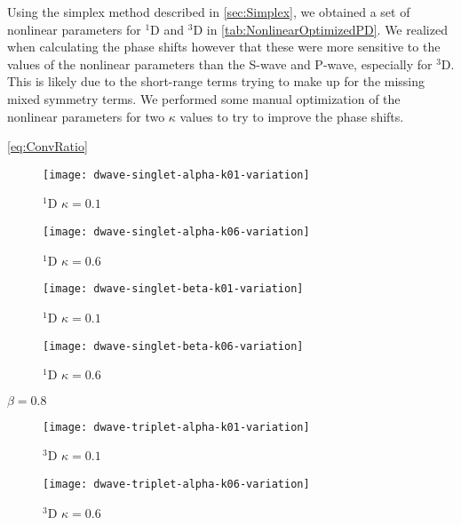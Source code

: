 \documentclass[Dissertation.tex]{subfiles}
\begin{document}
Using the simplex method described in \cref{sec:Simplex}, we obtained a set of
nonlinear parameters for $^1$D and $^3$D in \cref{tab:NonlinearOptimizedPD}.
We realized when calculating the phase shifts however that these were more
sensitive to the values of the nonlinear parameters than the S-wave and P-wave,
especially for $^3$D. This is likely due to the short-range terms trying to
make up for the missing mixed symmetry terms. We performed some manual
optimization of the nonlinear parameters for two $\kappa$ values to try to
improve the phase shifts.



\cref{eq:ConvRatio}

\begin{figure}[H]
	\centering
	\texttt{[image: dwave-singlet-alpha-k01-variation]}
	\caption{$^{1}$D $\kappa = 0.1$}
	\label{fig:dwave-singlet-alpha-k01-variation}
\end{figure}

\begin{figure}[H]
	\centering
	\texttt{[image: dwave-singlet-alpha-k06-variation]}
	\caption{$^1$D $\kappa = 0.6$}
	\label{fig:dwave-singlet-alpha-k06-variation}
\end{figure}


\begin{figure}[H]
	\centering
	\texttt{[image: dwave-singlet-beta-k01-variation]}
	\caption{$^{1}$D $\kappa = 0.1$}
	\label{fig:dwave-singlet-beta-k01-variation}
\end{figure}

\begin{figure}[H]
	\centering
	\texttt{[image: dwave-singlet-beta-k06-variation]}
	\caption{$^1$D $\kappa = 0.6$}
	\label{fig:dwave-singlet-beta-k06-variation}
\end{figure}

$\beta = 0.8$


\begin{figure}[H]
	\centering
	\texttt{[image: dwave-triplet-alpha-k01-variation]}
	\caption{$^3$D $\kappa = 0.1$}
	\label{fig:dwave-triplet-alpha-k01-variation}
\end{figure}

\begin{figure}[H]
	\centering
	\texttt{[image: dwave-triplet-alpha-k06-variation]}
	\caption{$^3$D $\kappa = 0.6$}
	\label{fig:dwave-triplet-alpha-k06-variation}
\end{figure}
\end{document}
